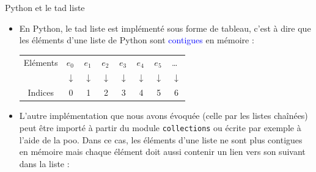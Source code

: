 \documentclass[10pt]{beamer}
\begin{document}
\begin{frame}
	\begin{block}{Python et le {\sc tad} liste}
		\begin{itemize}
			\item<1->En Python, le {\sc tad} liste est implémenté sous forme de tableau, c'est à dire que les éléments d'une liste de Python sont \textcolor{blue}{contigues} en mémoire :
			\begin{center}
				\begin{tabular}{l|p{0.2cm}|p{0.2cm}|p{0.2cm}|p{0.2cm}|p{0.2cm}|p{0.2cm}|p{0.2cm}|}
					\cline{2-8}
					Eléments                    & $e_0$                            & $e_1$                            & $e_2$                            & $e_3$                            & $e_4$                            & $e_5$                            & \dots                            \\
					\cline{2-8}
					\multicolumn{1}{c}{ }       & \multicolumn{1}{c}{$\downarrow$} & \multicolumn{1}{c}{$\downarrow$} & \multicolumn{1}{c}{$\downarrow$} & \multicolumn{1}{c}{$\downarrow$} & \multicolumn{1}{c}{$\downarrow$} & \multicolumn{1}{c}{$\downarrow$} & \multicolumn{1}{c}{$\downarrow$} \\
					\multicolumn{1}{c}{Indices} & \multicolumn{1}{c}{0}            & \multicolumn{1}{c}{1}            & \multicolumn{1}{c}{2}            & \multicolumn{1}{c}{3}            & \multicolumn{1}{c}{4}            & \multicolumn{1}{c}{5}            & \multicolumn{1}{c}{6}            \\
				\end{tabular}
			\end{center}
			\item<2-> L'autre implémentation que nous avons évoquée (celle par les listes chaînées) peut être importé à partir du module {\tt collections} ou écrite par exemple à l'aide de la {\sc poo}. Dans ce cas, les éléments d'une liste ne sont plus contigues en mémoire mais chaque élément doit aussi contenir un lien vers son suivant dans la liste :
				\begin{center}
					  \quad {} \         
				\end{center}
		\end{itemize}
	\end{block}
\end{frame}
\end{document}
